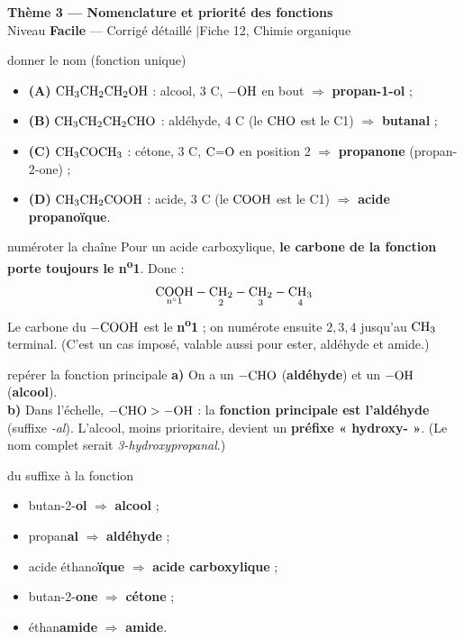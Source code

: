 \documentclass[11pt,a4paper]{article}
\newcommand{\rep}[1]{\textcolor{primarydark}{\textbf{#1}}}
\newcommand{\banner}[2]{%
\begin{tcolorbox}[enhanced,colback=excol,colframe=excol,arc=5pt,boxrule=0pt,
   left=5mm,right=5mm,top=2.5mm,bottom=2.5mm,coltext=white]
{\large\bfseries #1}\\[1pt]{\small #2}
\end{tcolorbox}\vspace{2pt}}
\begin{document}
\banner{Thème 3 — Nomenclature et priorité des fonctions}{Niveau \textbf{Facile} — Corrigé détaillé \quad$\vert$\quad Fiche 12, Chimie organique}

\begin{corr}{donner le nom (fonction unique)}
\begin{itemize}[leftmargin=1.6em,itemsep=1pt]
  \item \textbf{(A)} $\ce{CH3CH2CH2OH}$ : alcool, 3 C, $\ce{-OH}$ en bout $\Rightarrow$ \rep{propan-1-ol} ;
  \item \textbf{(B)} $\ce{CH3CH2CH2CHO}$ : aldéhyde, 4 C (le $\ce{CHO}$ est le C1) $\Rightarrow$ \rep{butanal} ;
  \item \textbf{(C)} $\ce{CH3COCH3}$ : cétone, 3 C, $\ce{C=O}$ en position 2 $\Rightarrow$ \rep{propanone} (propan-2-one) ;
  \item \textbf{(D)} $\ce{CH3CH2COOH}$ : acide, 3 C (le $\ce{COOH}$ est le C1) $\Rightarrow$ \rep{acide propanoïque}.
\end{itemize}
\end{corr}

\begin{corr}{numéroter la chaîne}
Pour un acide carboxylique, \textbf{le carbone de la fonction porte toujours le n\textsuperscript{o}1}. Donc :
\[ \underset{\text{n}^\circ 1}{\ce{COOH}}-\underset{2}{\ce{CH2}}-\underset{3}{\ce{CH2}}-\underset{4}{\ce{CH3}} \]
Le carbone du $\ce{-COOH}$ est le \rep{n\textsuperscript{o}1} ; on numérote ensuite $2,3,4$ jusqu'au $\ce{CH3}$ terminal. (C'est un cas imposé, valable aussi pour ester, aldéhyde et amide.)
\end{corr}

\begin{corr}{repérer la fonction principale}
\textbf{a)} On a un $\ce{-CHO}$ (\rep{aldéhyde}) et un $\ce{-OH}$ (\rep{alcool}).\\
\textbf{b)} Dans l'échelle, $\ce{-CHO} > \ce{-OH}$ : la \rep{fonction principale est l'aldéhyde} (suffixe \textit{-al}). L'alcool, moins prioritaire, devient un \rep{préfixe « hydroxy- »}. (Le nom complet serait \emph{3-hydroxypropanal}.)
\end{corr}

\begin{corr}{du suffixe à la fonction}
\begin{itemize}[leftmargin=1.6em,itemsep=1pt]
  \item butan-2-\textbf{ol} $\Rightarrow$ \rep{alcool} ;
  \item propan\textbf{al} $\Rightarrow$ \rep{aldéhyde} ;
  \item acide éthano\textbf{ïque} $\Rightarrow$ \rep{acide carboxylique} ;
  \item butan-2-\textbf{one} $\Rightarrow$ \rep{cétone} ;
  \item éthan\textbf{amide} $\Rightarrow$ \rep{amide}.
\end{itemize}
\end{corr}
\end{document}
